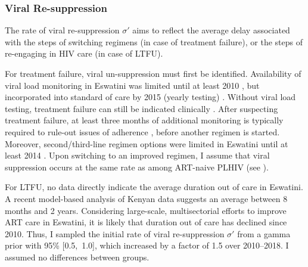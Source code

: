 \subsubsection{Viral Re-suppression}\label{model.par.cascade.retx}
The rate of viral re-suppression $\sigma'$ aims to reflect the average delay associated with
the steps of switching regimens (in case of treatment failure), or
the steps of re-engaging in HIV care (in case of LTFU).
\par
For treatment failure, viral un-suppression must first be identified.
Availability of viral load monitoring in Eswatini was limited until at least 2010 \cite{EswMOH2010},
but incorporated into standard of care by 2015 (yearly testing) \cite{EswMOH2015}.
Without viral load testing, treatment failure can still be indicated clinically \cite{EswMOH2010}.
After suspecting treatment failure, at least three months of additional monitoring
is typically required to rule-out issues of adherence \cite{EswMOH2010,EswMOH2015,EswMOH2018},
before another regimen is started.
Moreover, second/third-line regimen options
were limited in Eswatini until at least 2014 \cite{Jobanputra2015,NERCHA2014}.
Upon switching to an improved regimen, I assume that viral suppression occurs
at the same rate as among ART-naive PLHIV (see ).
\par
For LTFU, no data directly indicate the average duration out of care in Eswatini.
A recent model-based analysis of Kenyan data \cite{Bakoyannis2020} suggests
an average between 8 months and 2 years.
Considering large-scale, multisectorial efforts to improve ART care in Eswatini,
it is likely that duration out of care has declined since 2010.
Thus, I sampled the initial rate of viral re-suppression $\sigma'$ from
a gamma prior with 95\% [0.5,~1.0], which increased by a factor of 1.5 over 2010--2018.
I assumed no differences between groups.
